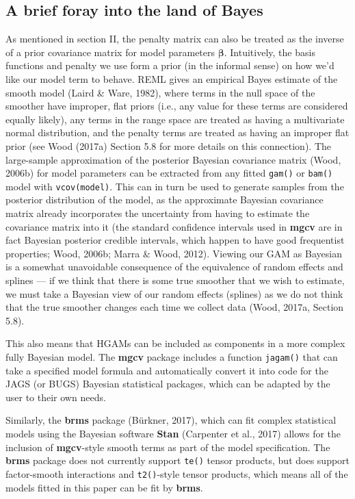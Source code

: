 \documentclass[12pt]{article}
\begin{document}
\subsection{A brief foray into the land of
Bayes}\label{a-brief-foray-into-the-land-of-bayes}

As mentioned in section II, the penalty matrix can also be treated as
the inverse of a prior covariance matrix for model parameters
\(\boldsymbol{\beta}\). Intuitively, the basis functions and penalty we
use form a prior (in the informal sense) on how we'd like our model term
to behave. REML gives an empirical Bayes estimate of the smooth model
(Laird \& Ware, 1982), where terms in the null space of the smoother
have improper, flat priors (i.e., any value for these terms are
considered equally likely), any terms in the range space are treated as
having a multivariate normal distribution, and the penalty terms are
treated as having an improper flat prior (see Wood (2017a) Section 5.8
for more details on this connection). The large-sample approximation of
the posterior Bayesian covariance matrix (Wood, 2006b) for model
parameters can be extracted from any fitted \texttt{gam()} or
\texttt{bam()} model with \texttt{vcov(model)}. This can in turn be used
to generate samples from the posterior distribution of the model, as the
approximate Bayesian covariance matrix already incorporates the
uncertainty from having to estimate the covariance matrix into it (the
standard confidence intervals used in \textbf{mgcv} are in fact Bayesian
posterior credible intervals, which happen to have good frequentist
properties; Wood, 2006b; Marra \& Wood, 2012). Viewing our GAM as
Bayesian is a somewhat unavoidable consequence of the equivalence of
random effects and splines --- if we think that there is some true
smoother that we wish to estimate, we must take a Bayesian view of our
random effects (splines) as we do not think that the true smoother
changes each time we collect data (Wood, 2017a, Section 5.8).

This also means that HGAMs can be included as components in a more
complex fully Bayesian model. The \textbf{mgcv} package includes a
function \texttt{jagam()} that can take a specified model formula and
automatically convert it into code for the JAGS (or BUGS) Bayesian
statistical packages, which can be adapted by the user to their own
needs.

Similarly, the \textbf{brms} package (Bürkner, 2017), which can fit
complex statistical models using the Bayesian software \textbf{Stan}
(Carpenter et al., 2017) allows for the inclusion of \textbf{mgcv}-style
smooth terms as part of the model specification. The \textbf{brms}
package does not currently support \texttt{te()} tensor products, but
does support factor-smooth interactions and \texttt{t2()}-style tensor
products, which means all of the models fitted in this paper can be fit
by \textbf{brms}.
\end{document}
